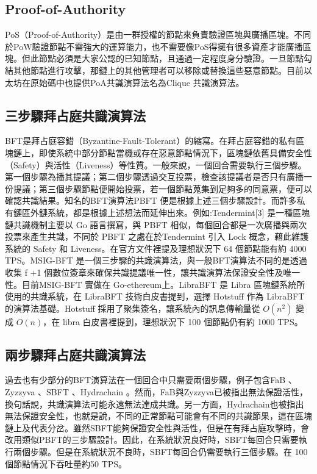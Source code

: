 \subsection{Proof-of-Authority}\label{se_7}
PoS（Proof-of-Authority）是由一群授權的節點來負責驗證區塊與廣播區塊。不同於PoW驗證節點不需強大的運算能力，也不需要像PoS得擁有很多資產才能廣播區塊。但此節點必須是大家公認的已知節點，且通過一定程度身分驗證。一旦節點勾結其他節點進行攻擊，那鏈上的其他管理者可以移除或替換這些惡意節點。目前以太坊在原始碼中也提供PoA共識演算法名為Clique \cite{clique}共識演算法。

\subsection{三步驟拜占庭共識演算法}\label{se_7}

BFT是拜占庭容錯（Byzantine-Fault-Tolerant）的縮寫。在拜占庭容錯的私有區塊鏈上，即使系統中部分節點當機或存在惡意節點情況下，區塊鏈依舊具備安全性（Safety）與活性（Liveness）等性質。一般來說，一個回合需要執行三個步驟。第一個步驟為播其提議；第二個步驟透過交互投票，檢查該提議者是否只有廣播一份提議；第三個步驟節點便開始投票，若一個節點蒐集到足夠多的同意票，便可以確認共識結果。知名的BFT演算法PBFT \cite{castro1999practical}便是根據上述三個步驟設計。而許多私有鏈區外鏈系統，都是根據上述想法而延伸出來。例如:Tendermint[3] 是一種區塊鏈共識機制主要以 Go 語言撰寫，與 PBFT 相似，每個回合都是一次廣播與兩次投票來產生共識，不同於 PBFT 之處在於Tendermint 引入 Lock 概念，藉此維護系統的 Safety 和 Liveness。在官方文件裡提及理想狀況下 64 個節點能有約 4000 TPS。MSIG­-BFT 是一個三步驟的共識演算法，與一般BFT演算法不同的是透過收集 f +1 個數位簽章來確保共識提議唯一性，讓共識演算法保證安全性及唯一性。目前MSIG­-BFT 實做在 Go­-ethereum上。LibraBFT \cite{STEVE_HANNA2010}是 Libra 區塊鏈系統所使用的共識系統，在 LibraBFT 技術白皮書提到，選擇 Hotstuff \cite{yin2018hotstuff} 作為 LibraBFT 的演算法基礎。Hotstuff 採用了聚集簽名，讓系統內的訊息傳輸量從 $O(n^2)$ 變成 $O(n)$，在 libra 白皮書裡提到，理想狀況下 100 個節點仍有約 1000 TPS。

\subsection{兩步驟拜占庭共識演算法}\label{se_7}
過去也有少部分的BFT演算法在一個回合中只需要兩個步驟，例子包含FaB \cite{abraham2018revisiting}、Zyzzyva \cite{kotla2007zyzzyva}、SBFT \cite{martin2006fast}、Hydrachain \cite{Hydrachain}。然而，FaB與Zyzzyva已被指出無法保證活性，換句話說，共識演算法可能永遠無法達成共識。另一方面，Hydrachain也被指出無法保證安全性，也就是說，不同的正常節點可能會有不同的共識節果，這在區塊鏈上及代表分岔。雖然SBFT能夠保證安全性與活性，但是在有拜占庭攻擊時，會改用類似PBFT的三步驟設計。因此，在系統狀況良好時，SBFT每回合只需要執行兩個步驟。但是在系統狀況不良時，SBFT每回合仍需要執行三個步驟。在 100 個節點情況下吞吐量約50 TPS。


